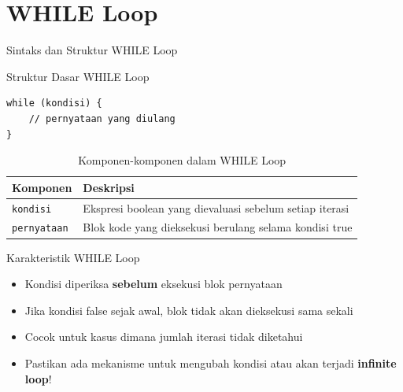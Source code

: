 \documentclass{beamer}
\begin{document}
\section{WHILE Loop}
\begin{frame}[fragile]{Sintaks dan Struktur WHILE Loop}
  \begin{block}{Struktur Dasar WHILE Loop}
    \begin{lstlisting}
while (kondisi) {
    // pernyataan yang diulang
}
    \end{lstlisting}
  \end{block}

  \vspace{-0.2cm}
  
  \begin{table}
    \scriptsize
    \begin{tabular}{p{}|p{}}
    \textbf{Komponen} & \textbf{Deskripsi} \\
    \hline
    \rowcolor{lightgray}
    \texttt{kondisi} & Ekspresi boolean yang dievaluasi sebelum setiap iterasi \\
    \rowcolor{white}
    \texttt{pernyataan} & Blok kode yang dieksekusi berulang selama kondisi true \\
    \end{tabular}
    \caption{Komponen-komponen dalam WHILE Loop}
  \end{table}

  \vspace{-0.2cm}
  
  \begin{block}{Karakteristik WHILE Loop}
  \scriptsize
    \begin{itemize}
      \item Kondisi diperiksa \textbf{sebelum} eksekusi blok pernyataan
      \item Jika kondisi false sejak awal, blok tidak akan dieksekusi sama sekali
      \item Cocok untuk kasus dimana jumlah iterasi tidak diketahui
      \item Pastikan ada mekanisme untuk mengubah kondisi atau akan terjadi \textbf{infinite loop}!
    \end{itemize}
  \end{block}
  
  
\end{frame}
\end{document}
